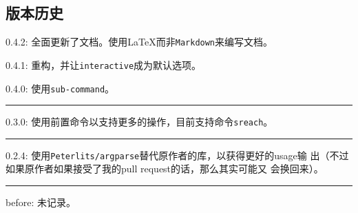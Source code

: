 \documentclass{peterlitsdoc}
\begin{document}
\subsection{版本历史}

\def\hline{\begingroup
    \noindent\pltgray\rule{\textwidth}{0.5pt}%
    \endgroup}

0.4.2: 全面更新了文档。使用\LaTeX{}而非\verb|Markdown|来编写文档。

0.4.1: 重构，并让\verb|interactive|成为默认选项。

0.4.0: 使用\verb|sub-command|。

\hline

0.3.0: 使用前置命令以支持更多的操作，目前支持命令\verb|sreach|。

\hline

0.2.4: 使用\verb|Peterlits/argparse|替代原作者的库，以获得更好的usage输
出（不过如果原作者如果接受了我的pull request的话，那么其实可能又
会换回来）。

\hline

before: 未记录。
\end{document}
